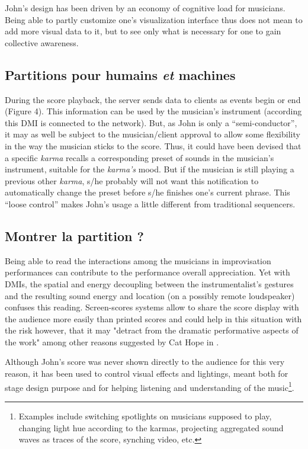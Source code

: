 John's design has been driven by an economy of cognitive load for musicians. Being able to partly customize one's visualization interface thus does not mean to add more visual data to it, but to see only what is necessary for one to gain collective awareness.

\subsection{Partitions pour humains \emph{et} machines}

During the score playback, the server sends data to clients as events begin or end (Figure 4). This information can be used by the musician's instrument (according this DMI is connected to the network). But, as John is only a “semi-conductor”, it may as well be subject to the musician/client approval to allow some flexibility in the way the musician sticks to the score. Thus, it could have been devised that a specific \textit{karma} recalls a corresponding preset of sounds in the musician's instrument, suitable for the \textit{karma's} mood. But if the musician is still playing a previous other \textit{karma}, s/he probably will not want this notification to automatically change the preset before s/he finishes one's current phrase. This “loose control” makes John's usage a little different from traditional sequencers.

\subsection{Montrer la partition ?}

Being able to read the interactions among the musicians in improvisation performances can contribute to the performance overall appreciation. Yet with DMIs, the spatial and energy decoupling between the instrumentalist's gestures and the resulting sound energy and location (on a possibly remote loudspeaker) confuses this reading. Screen-scores systems allow to share the score display with the audience more easily than printed scores and could help in this situation with the risk however, that it may "detract from the dramatic performative aspects of the work" among other reasons suggested by Cat Hope in \cite{hope_screen_2011}. 

Although John's score was never shown directly to the audience for this very reason, it has been used to control visual effects and lightings, meant both for stage design purpose and for helping listening and understanding of the music\footnote{Examples include switching spotlights on musicians supposed to play, changing light hue according to the karmas, projecting aggregated sound waves as traces of the score, synching video, etc.}.

